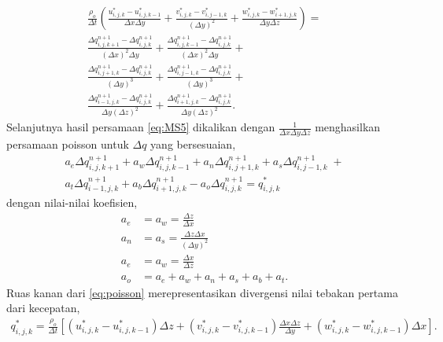 \begin{spacing}{1.5}
	\begin{equation}\label{eq:MS5}
		\begin{aligned}
			\frac{\rho_o}{\Delta t}\left(\frac{u_{i,j,k}^{*}-u_{i,j,k-1}^{*}}{\Delta x \Delta y} + \frac{v_{i,j,k}^{*}-v_{i,j-1,k}^{*}}{(\Delta y)^2} + \frac{w_{i,j,k}^{*}-w_{i+1,j,k}^{*}}{\Delta y \Delta z}\right) = \\
			\frac{\Delta q_{i,j,k+1}^{n+1}-\Delta q_{i,j,k}^{n+1}}{(\Delta x)^2\Delta y} + \frac{\Delta q_{i,j,k-1}^{n+1}-\Delta q_{i,j,k}^{n+1}}{(\Delta x)^2\Delta y} + \\
			\frac{\Delta q_{i,j+1,k}^{n+1}-\Delta q_{i,j,k}^{n+1}}{(\Delta y)^3} + \frac{\Delta q_{i,j-1,k}^{n+1}-\Delta q_{i,j,k}^{n+1}}{(\Delta y)^3} +
			\\
			\frac{\Delta q_{i-1,j,k}^{n+1}-\Delta q_{i,j,k}^{n+1}}{\Delta y(\Delta z)^2} + \frac{\Delta q_{i+1,j,k}^{n+1}-\Delta q_{i,j,k}^{n+1}}{\Delta y(\Delta z)^2}.
		\end{aligned}
	\end{equation}
	Selanjutnya hasil persamaan \ref{eq:MS5} dikalikan dengan $\frac{1}{\Delta x \Delta y \Delta z}$ menghasilkan persamaan poisson untuk $\Delta q$ yang bersesuaian,
	\begin{equation}\label{eq:poisson}
		\begin{aligned}
			a_e \Delta q_{i,j,k+1}^{n+1} + a_w \Delta q_{i,j,k-1}^{n+1} + a_n \Delta q_{i,j+1,k}^{n+1} + a_s \Delta q_{i,j-1,k}^{n+1} \; + \\
			a_t \Delta q_{i-1,j,k}^{n+1} +
			a_b \Delta q_{i+1,j,k}^{n+1} -
			a_o \Delta q_{i,j,k}^{n+1} = q_{i,j,k}^{*}
		\end{aligned}
	\end{equation}
	dengan nilai-nilai koefisien,
	\begin{equation}
		\begin{aligned}
			a_e &= a_w = \frac{\Delta z}{\Delta x} \\
			a_n &= a_s = \frac{\Delta z \Delta x}{(\Delta y)^2} \\
			a_e &= a_w = \frac{\Delta x}{\Delta z} \\
			a_o &= a_e + a_w + a_n + a_s + a_b + a_t.
		\end{aligned}
	\end{equation}
	Ruas kanan dari \ref{eq:poisson} merepresentasikan divergensi nilai tebakan pertama dari kecepatan, 
	\begin{equation*}
		\begin{aligned}
		q_{i,j,k}^{*} = \frac{\rho_o}{\Delta t}\left[(u_{i,j,k}^{*}-u_{i,j,k-1}^{*})\Delta z +  (v_{i,j,k}^{*}-v_{i,j,k-1}^{*})\frac{\Delta x \Delta z}{\Delta y}+(w_{i,j,k}^{*}-w_{i,j,k-1}^{*})\Delta x\right].

\end{aligned}
\end{equation*}
\end{spacing}
